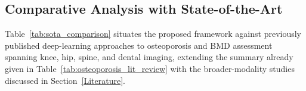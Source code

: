 \documentclass[conference]{IEEEtran}
\begin{document}
\begin{table}[!h]
\centering
\caption{Ablation Study Protocol and Results (test set, $n=293$)}
\label{tab:ablation}
\end{table}

\subsection{Comparative Analysis with State-of-the-Art}
\label{sec:comparison}
Table~\ref{tab:sota_comparison} situates the proposed framework against previously published deep-learning approaches to osteoporosis and BMD assessment spanning knee, hip, spine, and dental imaging, extending the summary already given in Table~\ref{tab:osteoporosis_lit_review} with the broader-modality studies discussed in Section~\ref{Literature}.
\end{document}
